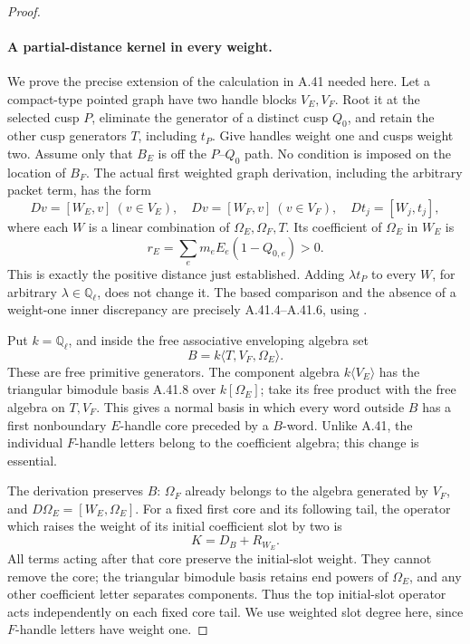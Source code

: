 \begin{proof}
\paragraph{A partial-distance kernel in every weight.}
We prove the precise extension of the calculation in A.41
needed here. Let a compact-type pointed graph have two
handle blocks \(V_E,V_F\). Root it at the selected cusp
\(P\), eliminate the generator of a distinct cusp \(Q_0\),
and retain the other cusp generators \(T\), including
\(t_P\). Give handles weight one and cusps weight two.
Assume only that \(B_E\) is off the \(P\)--\(Q_0\)
path. No condition is imposed on the location of \(B_F\).
The actual first weighted graph derivation, including the
arbitrary packet term, has the form
\[
 Dv=[W_E,v]\ (v\in V_E),\quad
 Dv=[W_F,v]\ (v\in V_F),\quad
 Dt_j=[W_j,t_j],
                                                        \tag{A.80.10}
\]
where each \(W\) is a linear combination of
\(\Omega_E,\Omega_F,T\). Its coefficient of \(\Omega_E\)
in \(W_E\) is
\[
 r_E=\sum_e m_e E_e(1-Q_{0,e})>0.                       \tag{A.80.11}
\]
This is exactly the positive distance just established.
Adding \(\lambda t_P\) to every \(W\), for arbitrary
\(\lambda\in\mathbb Q_\ell\), does not change it.
The based comparison and the absence of a weight-one inner
discrepancy are precisely A.41.4--A.41.6, using
\cite[Definition 3.1.5 and Theorem 3.1.6]{fghBettsDogra}.

Put \(k=\mathbb Q_\ell\), and inside the free associative
enveloping algebra set
\[
             B=k\langle T,V_F,\Omega_E\rangle.
                                                        \tag{A.80.12}
\]
These are free primitive generators. The component algebra
\(k\langle V_E\rangle\) has the triangular bimodule
basis A.41.8 over \(k[\Omega_E]\); take its free product
with the free algebra on \(T,V_F\). This gives a normal
basis in which every word outside \(B\) has a first
nonboundary \(E\)-handle core preceded by a \(B\)-word.
Unlike A.41, the individual \(F\)-handle letters belong
to the coefficient algebra; this change is essential.

The derivation preserves \(B\): \(\Omega_F\) already
belongs to the algebra generated by \(V_F\), and
\(D\Omega_E=[W_E,\Omega_E]\). For a fixed first core
and its following tail, the operator which raises the
weight of its initial coefficient slot by two is
\[
                         K=D_B+R_{W_E}.                \tag{A.80.13}
\]
All terms acting after that core preserve the initial-slot
weight. They cannot remove the core; the triangular
bimodule basis retains end powers of \(\Omega_E\),
and any other coefficient letter separates components.
Thus the top initial-slot operator acts independently on
each fixed core tail. We use weighted slot degree here,
since \(F\)-handle letters have weight one.


\end{proof}
